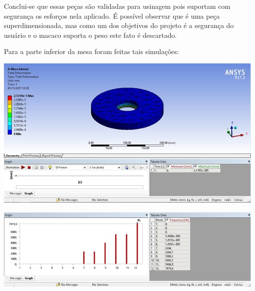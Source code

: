     Conclui-se que essas peças são validadas para usinagem pois suportam com segurança os esforços nela aplicado. É possível observar que é uma peça superdimensionada, mas como um dos objetivos do projeto é a segurança do usuário e o macaco suporta o peso este fato é descartado.

    Para a parte inferior da mesa foram feitas tais simulações:

    \begin{center}
    	\includegraphics[scale=0.7]{figuras/modal_corpo_livre_1}
        \label{modal_corpo_livre_1}
    \end{center}

    \begin{center}
    	\includegraphics[scale=0.7]{figuras/ressonancia_1}
        \label{ressonancia_1}
    \end{center}
    
